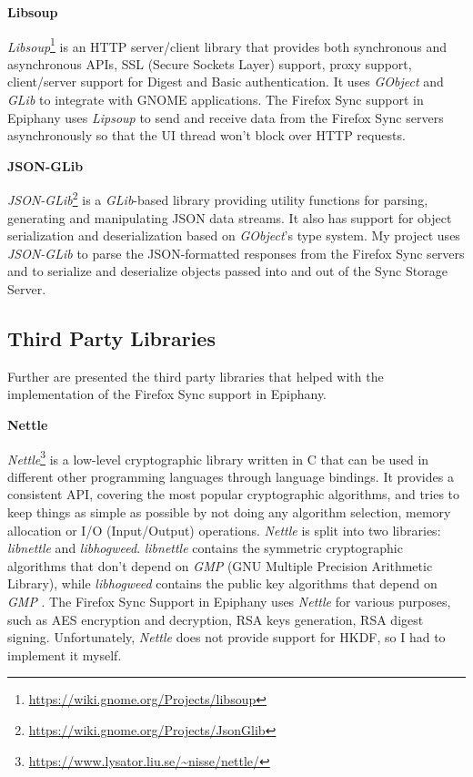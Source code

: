 \textbf{Libsoup}

\textit{Libsoup}\footnote{\url{https://wiki.gnome.org/Projects/libsoup}} is an HTTP server/client library that provides both synchronous and asynchronous APIs, SSL (Secure Sockets Layer) support, proxy support, client/server support for Digest and Basic authentication. It uses \textit{GObject} and \textit{GLib} to integrate with GNOME applications. The Firefox Sync support in Epiphany uses \textit{Lipsoup} to send and receive data from the Firefox Sync servers asynchronously so that the UI thread won't block over HTTP requests.

\textbf{JSON-GLib}

\textit{JSON-GLib}\footnote{\url{https://wiki.gnome.org/Projects/JsonGlib}} is a \textit{GLib}-based library providing utility functions for parsing, generating and manipulating JSON data streams. It also has support for object serialization and deserialization based on \textit{GObject}'s type system. My project uses \textit{JSON-GLib} to parse the JSON-formatted responses from the Firefox Sync servers and to serialize and deserialize objects passed into and out of the Sync Storage Server.

\subsection{Third Party Libraries}
\label{sub-sec:thirs-party-libraries}

Further are presented the third party libraries that helped with the implementation of the Firefox Sync support in Epiphany.

\textbf{Nettle}

\textit{Nettle}\footnote{\url{https://www.lysator.liu.se/~nisse/nettle/}} is a low-level cryptographic library written in C that can be used in different other programming languages through language bindings. It provides a consistent API, covering the most popular cryptographic algorithms, and tries to keep things as simple as possible by not doing any algorithm selection, memory allocation or I/O (Input/Output) operations. \textit{Nettle} is split into two libraries: \textit{libnettle} and \textit{libhogweed}. \textit{libnettle} contains the symmetric cryptographic algorithms that don't depend on \textit{GMP} (GNU Multiple Precision Arithmetic Library), while \textit{libhogweed} contains the public key algorithms that depend on \textit{GMP} \cite{moller2001nettle}. The Firefox Sync Support in Epiphany uses \textit{Nettle} for various purposes, such as AES encryption and decryption, RSA keys generation, RSA digest signing. Unfortunately, \textit{Nettle} does not provide support for HKDF, so I had to implement it myself.

